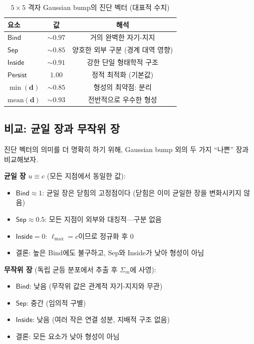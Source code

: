 \begin{table}[t]
\centering
\caption{$5 \times 5$ 격자 Gaussian bump의 진단 벡터 (대표적 수치)}
\label{tab:gaussian-diagnostics}
\begin{tabular}{lcc}
\hline
\textbf{요소} & \textbf{값} & \textbf{해석} \\
\hline
$\mathsf{Bind}$ & $\sim 0.97$ & 거의 완벽한 자기-지지 \\
$\mathsf{Sep}$ & $\sim 0.85$ & 양호한 외부 구분 (경계 대역 영향) \\
$\mathsf{Inside}$ & $\sim 0.91$ & 강한 단일 형태학적 구조 \\
$\mathsf{Persist}$ & $1.00$ & 정적 최적화 (기본값) \\
\hline
$\min(\mathbf{d})$ & $\sim 0.85$ & 형성의 최약점: 분리 \\
$\mathrm{mean}(\mathbf{d})$ & $\sim 0.93$ & 전반적으로 우수한 형성 \\
\hline
\end{tabular}
\end{table}


\subsection{비교: 균일 장과 무작위 장}

진단 벡터의 의미를 더 명확히 하기 위해, Gaussian bump 외의 두 가지 ``나쁜'' 장과 비교해보자.

\textbf{균일 장} $u \equiv c$ (모든 지점에서 동일한 값):
\begin{itemize}
    \item $\mathsf{Bind} \approx 1$: 균일 장은 닫힘의 고정점이다 (닫힘은 이미 균일한 장을 변화시키지 않음)
    \item $\mathsf{Sep} \approx 0.5$: 모든 지점이 외부와 대칭적---구분 없음
    \item $\mathsf{Inside} = 0$: $\ell_{\max} = c$이므로 정규화 후 0
    \item 결론: 높은 Bind에도 불구하고, Sep와 Inside가 낮아 형성이 아님
\end{itemize}

\textbf{무작위 장} (독립 균등 분포에서 추출 후 $\Sigma_m$에 사영):
\begin{itemize}
    \item $\mathsf{Bind}$: 낮음 (무작위 값은 관계적 자기-지지와 무관)
    \item $\mathsf{Sep}$: 중간 (임의적 구별)
    \item $\mathsf{Inside}$: 낮음 (여러 작은 연결 성분, 지배적 구조 없음)
    \item 결론: 모든 요소가 낮아 형성이 아님
\end{itemize}

